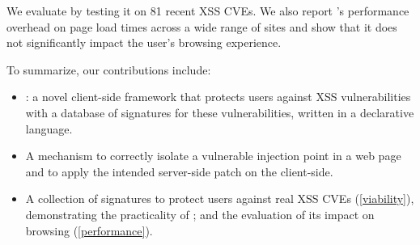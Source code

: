

We evaluate \sys by
testing it on 81 recent \ac{XSS} \ac{CVE}s. %
%
We also report \sys{}'s performance overhead on page load times
across a wide range of sites and show that it does not significantly
impact the user's browsing experience.

To summarize, our contributions include:
\begin{itemize}

	\item \sys: a novel client-side framework that protects
          users against XSS vulnerabilities with a database of
          signatures for these vulnerabilities, written in a
          declarative language.

	\item A mechanism to correctly isolate a vulnerable injection
          point in a web page and to apply the intended server-side
          patch on the client-side.

	\item A collection of signatures to protect users against
          real XSS CVEs (\autoref{viability}), demonstrating the practicality
          of \sys; and the evaluation of its impact on browsing (\autoref{performance}). %

\end{itemize}
